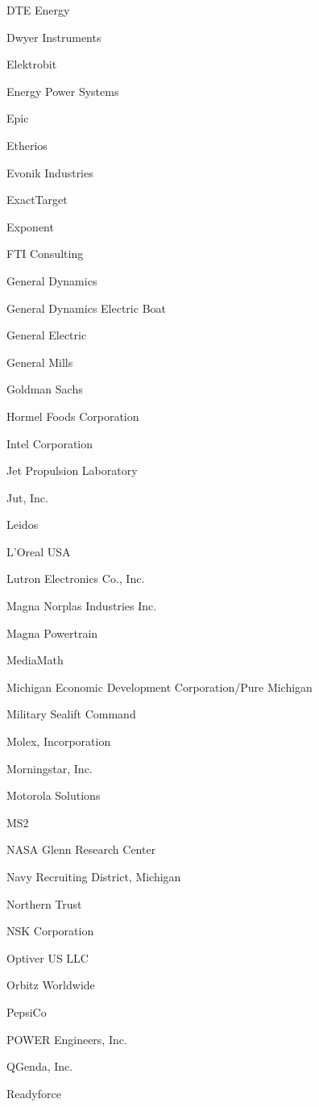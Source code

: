\documentclass[twoside]{article}
\begin{document}
\begin{center}
\begin{multicols}{5}
\begin{FlushLeft}
\begin{compactitem}
\item DTE Energy
\item Dwyer Instruments
\item Elektrobit
\item Energy Power Systems
\item Epic
\item Etherios
\item Evonik Industries
\item ExactTarget
\item Exponent
\item FTI Consulting
\item General Dynamics
\item General Dynamics Electric Boat
\item General Electric
\item General Mills
\item Goldman Sachs
\item Hormel Foods Corporation
\item Intel Corporation
\item Jet Propulsion Laboratory
\item Jut, Inc.
\item Leidos
\item L'Oreal USA
\item Lutron Electronics Co., Inc.
\item Magna Norplas Industries Inc.
\item Magna Powertrain
\item MediaMath
\item Michigan Economic Development Corporation/Pure Michigan
\item Military Sealift Command
\item Molex, Incorporation
\item Morningstar, Inc.
\item Motorola Solutions
\item MS2
\item NASA Glenn Research Center
\item Navy Recruiting District, Michigan
\item Northern Trust
\item NSK Corporation
\item Optiver US LLC
\item Orbitz Worldwide
\item PepsiCo
\item POWER Engineers, Inc.
\item QGenda, Inc.
\item Readyforce

\end{compactitem}
\end{FlushLeft}
\end{multicols}
\end{center}
\end{document}
